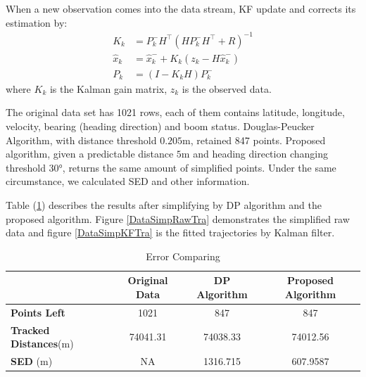 When a new observation comes into the data stream, KF update and corrects its estimation by: 
\begin{align*}
K_k&=P_k^-H^\top (HP_k^-H^\top+R)^{-1} \\
\hat{x}_k&=\hat{x}_k^-+K_k(z_k-H\hat{x}_k^-) \\
P_k&=(I-K_kH)P_k^-
\end{align*}
where $K_k$ is the Kalman gain matrix, $z_k$ is the observed data.


The original data set has 1021 rows, each of them contains latitude, longitude, velocity, bearing (heading direction) and boom status. Douglas-Peucker Algorithm, with distance threshold $0.205$m, retained 847 points. Proposed algorithm, given a predictable distance $5$m and heading direction changing threshold $\ang{30}$, returns the same amount of simplified points. Under the same circumstance, we calculated SED and other information. 

Table (\ref{DataSimpCompTable}) describes the results after simplifying by DP algorithm and the proposed algorithm. Figure \ref{DataSimpRawTra} demonstrates the simplified raw data and figure \ref{DataSimpKFTra} is the fitted trajectories by Kalman filter. 

\begin{table}
\centering
\caption{Error Comparing}
\label{DataSimpCompTable}
\begin{tabular}{|l|c|c|c|}
\hline 
  & \textbf{Original Data} & \textbf{DP Algorithm} & \textbf{Proposed Algorithm}  \\
\hline 
\textbf{Points Left} & 1021              & 847         & 847         \\
\textbf{Tracked Distances}(m)  & 74041.31     & 74038.33    & 74012.56     \\
\textbf{SED} (m)    & NA        & 1316.715    & 607.9587   \\
\hline 
\end{tabular}
\end{table}


